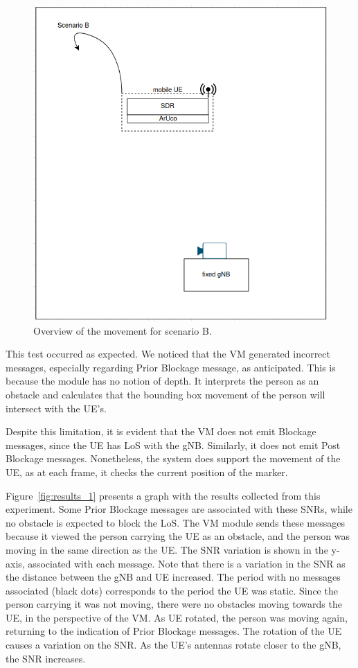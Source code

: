 \begin{figure}[H]
    \centering
    \includegraphics[width=0.5\linewidth]{figures/scenario1}
    \caption{Overview of the movement for scenario B.}
    \label{fig:test_movUE}
\end{figure}

This test occurred as expected.
We noticed that the VM generated incorrect messages, especially regarding Prior Blockage message, as anticipated.
This is because the module has no notion of depth.
It interprets the person as an obstacle and calculates that the bounding box movement of the person will intersect with the UE's.

Despite this limitation, it is evident that the VM does not emit Blockage messages, since the UE has LoS with the gNB\@.
Similarly, it does not emit Post Blockage messages.
Nonetheless, the system does support the movement of the UE, as at each frame, it checks the current position of the marker.

Figure~\ref{fig:results_1} presents a graph with the results collected from this experiment.
Some Prior Blockage messages are associated with these SNRs, while no obstacle is expected to block the LoS\@.
The VM module sends these messages because it viewed the person carrying the UE as an obstacle, and the person was moving in the same direction as the UE\@.
The SNR variation is shown in the y-axis, associated with each message.
Note that there is a variation in the SNR as the distance between the gNB and UE increased.
The period with no messages associated (black dots) corresponds to the period the UE was static.
Since the person carrying it was not moving, there were no obstacles moving towards the UE, in the perspective of the VM\@.
As UE rotated, the person was moving again, returning to the indication of Prior Blockage messages.
The rotation of the UE causes a variation on the SNR\@.
As the UE's antennas rotate closer to the gNB, the SNR increases.

